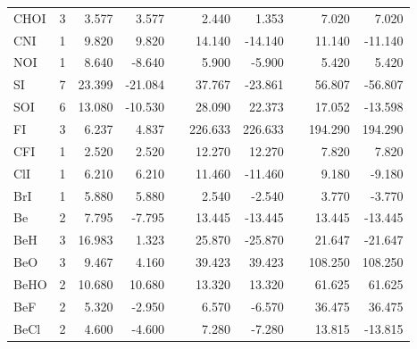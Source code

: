 \begin{table}
\begin{center}
\begin{tabular}{lrrrrrrrrr}
      CHOI    &      3 &    3.577 &    3.577 &  &    2.440 &    1.353 &  &    7.020 &    7.020 \\
      CNI     &      1 &    9.820 &    9.820 &  &   14.140 &  -14.140 &  &   11.140 &  -11.140 \\
      NOI     &      1 &    8.640 &   -8.640 &  &    5.900 &   -5.900 &  &    5.420 &    5.420 \\
      SI      &      7 &   23.399 &  -21.084 &  &   37.767 &  -23.861 &  &   56.807 &  -56.807 \\
      SOI     &      6 &   13.080 &  -10.530 &  &   28.090 &   22.373 &  &   17.052 &  -13.598 \\
      FI      &      3 &    6.237 &    4.837 &  &  226.633 &  226.633 &  &  194.290 &  194.290 \\
      CFI     &      1 &    2.520 &    2.520 &  &   12.270 &   12.270 &  &    7.820 &    7.820 \\
      ClI     &      1 &    6.210 &    6.210 &  &   11.460 &  -11.460 &  &    9.180 &   -9.180 \\
      BrI     &      1 &    5.880 &    5.880 &  &    2.540 &   -2.540 &  &    3.770 &   -3.770 \\
      Be      &      2 &    7.795 &   -7.795 &  &   13.445 &  -13.445 &  &   13.445 &  -13.445 \\
      BeH     &      3 &   16.983 &    1.323 &  &   25.870 &  -25.870 &  &   21.647 &  -21.647 \\
      BeO     &      3 &    9.467 &    4.160 &  &   39.423 &   39.423 &  &  108.250 &  108.250 \\
      BeHO    &      2 &   10.680 &   10.680 &  &   13.320 &   13.320 &  &   61.625 &   61.625 \\
      BeF     &      2 &    5.320 &   -2.950 &  &    6.570 &   -6.570 &  &   36.475 &   36.475 \\
      BeCl    &      2 &    4.600 &   -4.600 &  &    7.280 &   -7.280 &  &   13.815 &  -13.815 \\
\hline
\end{tabular}
\end{center}
\end{table}

